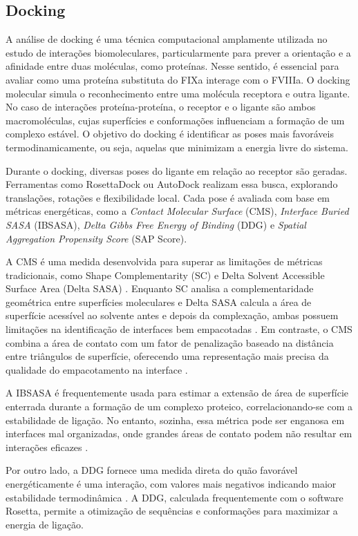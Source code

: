 \subsection{Docking}
\label{subsection:Docking} 
A análise de docking é uma técnica computacional amplamente utilizada no estudo de interações biomoleculares,
particularmente para prever a orientação e a afinidade entre duas moléculas,
como proteínas. Nesse sentido, é essencial para avaliar como uma proteína substituta do FIXa interage com o FVIIIa. 
O docking molecular simula o reconhecimento entre uma molécula receptora e outra ligante. 
No caso de interações proteína-proteína, o receptor e o ligante são ambos macromoléculas,
cujas superfícies e conformações influenciam a formação de um complexo estável.
O objetivo do docking é identificar as poses mais favoráveis termodinamicamente, ou seja, 
aquelas que minimizam a energia livre do sistema.

Durante o docking, diversas poses do ligante em relação ao receptor são geradas.
Ferramentas como RosettaDock ou AutoDock realizam essa busca, explorando translações, rotações e flexibilidade local.
Cada pose é avaliada com base em métricas energéticas, como a \textit{Contact Molecular Surface} (CMS), \textit{Interface Buried SASA} (IBSASA),
\textit{Delta Gibbs Free Energy of Binding} (DDG) e \textit{Spatial Aggregation Propensity Score} (SAP Score).

A CMS é uma medida desenvolvida para superar as limitações de métricas tradicionais, 
como Shape Complementarity (SC) e Delta Solvent Accessible Surface Area (Delta SASA) \cite{Docking}.
Enquanto SC analisa a complementaridade geométrica entre superfícies moleculares e 
Delta SASA calcula a área de superfície acessível ao solvente antes e depois da complexação,
ambas possuem limitações na identificação de interfaces bem empacotadas \cite{Docking}.
Em contraste, o CMS combina a área de contato com um fator de penalização baseado na distância entre triângulos de superfície,
oferecendo uma representação mais precisa da qualidade do empacotamento na interface \cite{Docking}.

A IBSASA é frequentemente usada para estimar a extensão de área de superfície enterrada durante a formação de um complexo proteico,
correlacionando-se com a estabilidade de ligação. 
No entanto, sozinha, essa métrica pode ser enganosa em interfaces mal organizadas, 
onde grandes áreas de contato podem não resultar em interações eficazes \cite{Docking}. 

Por outro lado, a DDG fornece uma medida direta do quão favorável energéticamente é uma interação,
com valores mais negativos indicando maior estabilidade termodinâmica \cite{Docking}. 
A DDG, calculada frequentemente com o software Rosetta, 
permite a otimização de sequências e conformações para maximizar a energia de ligação.

